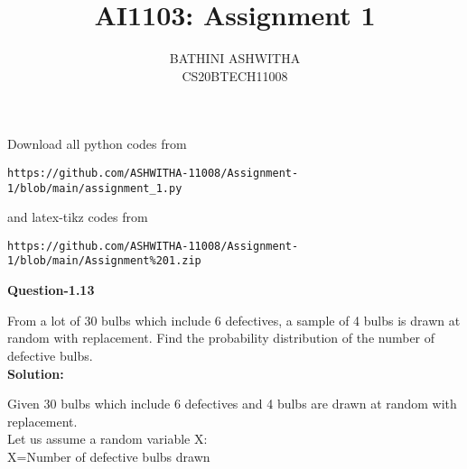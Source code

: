 \documentclass[journal,12pt,twocolumn]{IEEEtran}
\begin{document}
\newcommand{\solution}{\noindent \textbf{Solution: }}
\newcommand{\cosec}{\,\text{cosec}\,}
\providecommand{\dec}[2]{\ensuremath{\overset{#1}{\underset{#2}{\gtrless}}}}
\newcommand{\myvec}[1]{\ensuremath{\begin{pmatrix}#1\end{pmatrix}}}
\newcommand{\mydet}[1]{\ensuremath{\begin{vmatrix}#1\end{vmatrix}}}
\makeatletter
{}
\makeatother
\let\StandardTheFigure\thefigure
\let\vec\mathbf
\renewcommand{\thefigure}{\theproblem}
\def\putbox#1#2#3{\makebox[0in][l]{\makebox[#1][l]{}\raisebox{\baselineskip}[0in][0in]{\raisebox{#2}[0in][0in]{#3}}}}
     \def\rightbox#1{\makebox[0in][r]{#1}}
     \def\centbox#1{\makebox[0in]{#1}}
     \def\topbox#1{\raisebox{-\baselineskip}[0in][0in]{#1}}
     \def\midbox#1{\raisebox{-0.5\baselineskip}[0in][0in]{#1}}
\vspace{3cm}
\title{AI1103: Assignment 1}
\author{BATHINI ASHWITHA \\ CS20BTECH11008}
\maketitle
\newpage
\bigskip
\renewcommand{\thefigure}{\theenumi}
\renewcommand{\thetable}{\theenumi}
Download all python codes from 
\begin{lstlisting}
https://github.com/ASHWITHA-11008/Assignment-1/blob/main/assignment_1.py
\end{lstlisting}
%
and latex-tikz codes from 
%
\begin{lstlisting}
https://github.com/ASHWITHA-11008/Assignment-1/blob/main/Assignment%201.zip
\end{lstlisting}

\textbf{Question-1.13}

From a lot of 30 bulbs which include 6 defectives, a sample of 4 bulbs is drawn at random with replacement. Find the probability distribution of the number of defective bulbs.\\

\textbf{Solution:}

Given 30 bulbs which include 6 defectives and 4 bulbs are drawn at random with replacement.\\

Let us assume a random variable X:\\
X=Number of defective bulbs drawn\\
\end{document}

